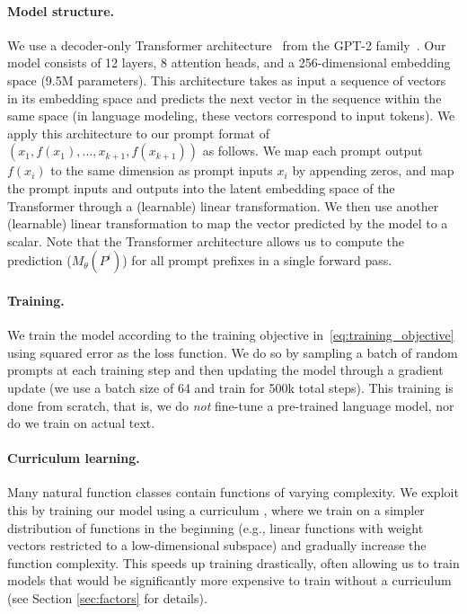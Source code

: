 \documentclass{article}
\begin{document}
\paragraph{Model structure.}
We use a decoder-only Transformer architecture~\citep{vaswani2017attention} from the GPT-2 family~\citep{radford2019language}. 
Our model consists of 12 layers, 8 attention heads, and a 256-dimensional embedding space (9.5M parameters).
This architecture takes as input a sequence of vectors in its embedding space and predicts the next vector in the sequence within the same space (in language modeling, these vectors correspond to input tokens).
We apply this architecture to our prompt format of $(x_1,f(x_1),\ldots,x_{k+1},f(x_{k+1}))$ as follows.
We map each prompt output $f(x_i)$ to the same dimension as prompt inputs $x_i$ by appending zeros, and map the prompt inputs and outputs into the latent embedding space of the Transformer through a (learnable) linear transformation.
We then use another (learnable) linear transformation to map the vector predicted by the model to a scalar.
Note that the Transformer architecture allows us to compute the prediction ($M_\theta(P^i)$) for all prompt prefixes in a single forward pass.

\paragraph{Training.}
We train the model according to the training objective in~\eqref{eq:training_objective} using squared error as the loss function. 
We do so by sampling a batch of random prompts at each training step and then updating the model through a gradient update (we use a batch size of 64 and train for 500k total steps). 
This training is done from scratch, that is, we do \emph{not} fine-tune a pre-trained language model, nor do we train on actual text.

\paragraph{Curriculum learning.}
Many natural function classes contain functions of varying complexity. We exploit this by training our model using a curriculum \citep{bengio2009curriculum, elman1993learning, sanger1994neural, wu2020curricula}, where we train on a simpler distribution of functions in the beginning (e.g., linear functions with weight vectors restricted to a low-dimensional subspace) and gradually increase the function complexity.
This speeds up training drastically, 
often allowing us to train models that would be significantly more expensive to train without a curriculum (see Section \ref{sec:factors} for details).
\end{document}
